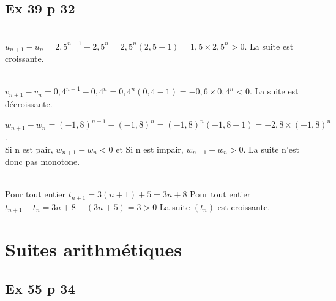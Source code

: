 \documentclass[a4paper,french]{book}
\begin{document}
\subsection*{Ex 39 p 32}
\begin{enumMet}
    \item {}\\
    $u_{n+1}-u_n=2,5^{n+1}-2,5^n=2,5^n(2,5-1)=1,5\times2,5^n>0$. La suite est croissante.
    \item {}\\
    $v_{n+1}-v_n=0,4^{n+1}-0,4^n=0,4^n(0,4-1)=-0,6\times0,4^n<0$. La suite est décroissante.
    \item {}
    $w_{n+1}-w_n=(-1,8)^{n+1}-(-1,8)^n=(-1,8)^n(-1,8-1)=-2,8\times(-1,8)^n$.\\
    Si n est pair, $w_{n+1}-w_n<0$ et Si n est impair, $w_{n+1}-w_n>0$. La suite n'est donc pas monotone.
    \item {}\\
    Pour tout entier $t_{n+1}=3(n+1)+5=3 n+8$
    Pour tout entier $t_{n+1}-t_{n}=3 n+8-(3 n+5)=3>0$
    La suite $\left(t_{n}\right)$ est croissante.\\
\end{enumMet}

\section*{Suites arithmétiques}


\subsection*{Ex 55 p 34}
\end{document}
